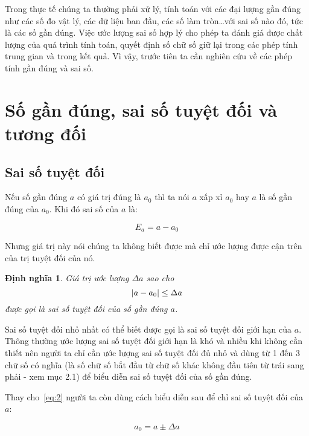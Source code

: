 \documentclass{book}
\newtheorem{definition}{Định nghĩa}
\DeclarePairedDelimiter\abs{\lvert}{\rvert}%
\begin{document}
Trong thực tế chúng ta thường phải xử lý, tính toán với các đại lượng gần đúng
như các số đo vật lý, các dữ liệu ban đầu, các số làm tròn…với sai số nào đó,
tức là các số gần đúng. Việc ước lượng sai số hợp lý cho phép ta đánh giá được
chất lượng của quá trình tính toán, quyết định số chữ số giữ lại trong các phép
tính trung gian và trong kết quả. Vì vậy, trước tiên ta cần nghiên cứu về các
phép tính gần đúng và sai số.

\section{Số gần đúng, sai số tuyệt đối và tương đối}

\subsection{Sai số tuyệt đối}

Nếu số gần đúng \(a\) có giá trị đúng là \(a_0\) thì ta nói \(a\) xấp xỉ \(a_0\)
hay \(a\) là số gần đúng của \(a_0\). Khi đó sai số của \(a\) là:

\begin{equation} \label{eq:1}
    E_a = a - a_0
\end{equation}

Nhưng giá trị này nói chúng ta không biết được mà chỉ ước lượng được cận trên
của trị tuyệt đối của nó.

\begin{definition}
    Giá trị ước lượng \(\Delta a\) sao cho
    \begin{equation} \label{eq:2}
        \abs{a - a_0} \leq \Delta a
    \end{equation}
    được gọi là \emph{sai số tuyệt đối} của số gần đúng \(a\).
\end{definition}

Sai số tuyệt đối nhỏ nhất có thể biết được gọi là sai số tuyệt đối giới hạn của
\(a\). Thông thường ước lượng sai số tuyệt đối giới hạn là khó và nhiều khi
không cần thiết nên người ta chỉ cần ước lượng sai số tuyệt đối đủ nhỏ và dùng
từ 1 đến 3 chữ số có nghĩa (là số chữ số bắt đầu từ chữ số khác không đầu tiên
từ trái sang phải - xem mục 2.1) để biểu diễn sai số tuyệt đối của số gần đúng.

Thay cho~\ref{eq:2} người ta còn dùng cách biểu diễn sau để chỉ sai số tuyệt đối
của \(a\):

\begin{equation} \label{eq:3}
    a_0 = a \pm \Delta a
\end{equation}
\end{document}
